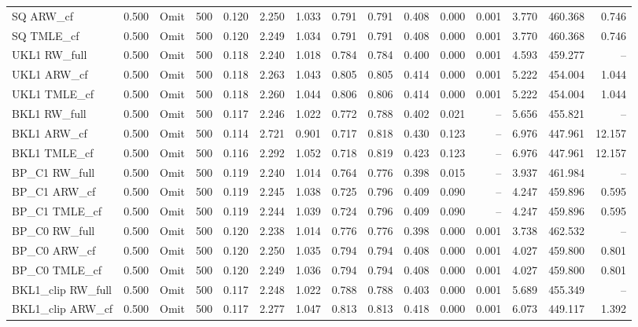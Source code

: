 \begin{tabular}{llllrrrrrrrrrrr}
SQ ARW\_cf & 0.500 & Omit & 500 & 0.120 & 2.250 & 1.033 & 0.791 & 0.791 & 0.408 & 0.000 & 0.001 & 3.770 & 460.368 & 0.746 \\
SQ TMLE\_cf & 0.500 & Omit & 500 & 0.120 & 2.249 & 1.034 & 0.791 & 0.791 & 0.408 & 0.000 & 0.001 & 3.770 & 460.368 & 0.746 \\
UKL1 RW\_full & 0.500 & Omit & 500 & 0.118 & 2.240 & 1.018 & 0.784 & 0.784 & 0.400 & 0.000 & 0.001 & 4.593 & 459.277 & -- \\
UKL1 ARW\_cf & 0.500 & Omit & 500 & 0.118 & 2.263 & 1.043 & 0.805 & 0.805 & 0.414 & 0.000 & 0.001 & 5.222 & 454.004 & 1.044 \\
UKL1 TMLE\_cf & 0.500 & Omit & 500 & 0.118 & 2.260 & 1.044 & 0.806 & 0.806 & 0.414 & 0.000 & 0.001 & 5.222 & 454.004 & 1.044 \\
BKL1 RW\_full & 0.500 & Omit & 500 & 0.117 & 2.246 & 1.022 & 0.772 & 0.788 & 0.402 & 0.021 & -- & 5.656 & 455.821 & -- \\
BKL1 ARW\_cf & 0.500 & Omit & 500 & 0.114 & 2.721 & 0.901 & 0.717 & 0.818 & 0.430 & 0.123 & -- & 6.976 & 447.961 & 12.157 \\
BKL1 TMLE\_cf & 0.500 & Omit & 500 & 0.116 & 2.292 & 1.052 & 0.718 & 0.819 & 0.423 & 0.123 & -- & 6.976 & 447.961 & 12.157 \\
BP\_C1 RW\_full & 0.500 & Omit & 500 & 0.119 & 2.240 & 1.014 & 0.764 & 0.776 & 0.398 & 0.015 & -- & 3.937 & 461.984 & -- \\
BP\_C1 ARW\_cf & 0.500 & Omit & 500 & 0.119 & 2.245 & 1.038 & 0.725 & 0.796 & 0.409 & 0.090 & -- & 4.247 & 459.896 & 0.595 \\
BP\_C1 TMLE\_cf & 0.500 & Omit & 500 & 0.119 & 2.244 & 1.039 & 0.724 & 0.796 & 0.409 & 0.090 & -- & 4.247 & 459.896 & 0.595 \\
BP\_C0 RW\_full & 0.500 & Omit & 500 & 0.120 & 2.238 & 1.014 & 0.776 & 0.776 & 0.398 & 0.000 & 0.001 & 3.738 & 462.532 & -- \\
BP\_C0 ARW\_cf & 0.500 & Omit & 500 & 0.120 & 2.250 & 1.035 & 0.794 & 0.794 & 0.408 & 0.000 & 0.001 & 4.027 & 459.800 & 0.801 \\
BP\_C0 TMLE\_cf & 0.500 & Omit & 500 & 0.120 & 2.249 & 1.036 & 0.794 & 0.794 & 0.408 & 0.000 & 0.001 & 4.027 & 459.800 & 0.801 \\
BKL1\_clip RW\_full & 0.500 & Omit & 500 & 0.117 & 2.248 & 1.022 & 0.788 & 0.788 & 0.403 & 0.000 & 0.001 & 5.689 & 455.349 & -- \\
BKL1\_clip ARW\_cf & 0.500 & Omit & 500 & 0.117 & 2.277 & 1.047 & 0.813 & 0.813 & 0.418 & 0.000 & 0.001 & 6.073 & 449.117 & 1.392 \\

\end{tabular}
